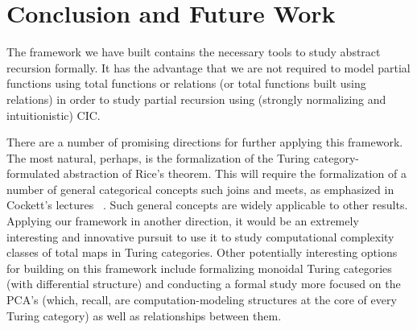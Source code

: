 \documentclass{entcs} \usepackage{entcsmacro}
\begin{document}
\section{Conclusion and Future Work}

The framework we have built contains the necessary tools to study
abstract recursion formally. It has the advantage that we are not
required to model partial functions using total functions or relations
(or total functions built using relations) in order to study partial
recursion using (strongly normalizing and intuitionistic) CIC.

There are a number of promising directions
for further applying this framework.  The most natural, perhaps, is
the formalization of the Turing category-formulated abstraction of
Rice's theorem.  This will require the formalization of a number of
general categorical concepts such joins and meets, as emphasized in
Cockett's lectures ~\cite{Estonia}.  Such general concepts are widely
applicable to other results.  Applying our framework in another
direction, it would be an extremely interesting and innovative pursuit
to use it to study computational complexity classes of total maps in
Turing categories. Other potentially interesting options for building
on this framework include formalizing monoidal Turing categories (with
differential structure) and conducting a formal study more focused on
the PCA's (which, recall, are computation-modeling structures at the
core of every Turing category) as well as relationships between them.








\end{document}
